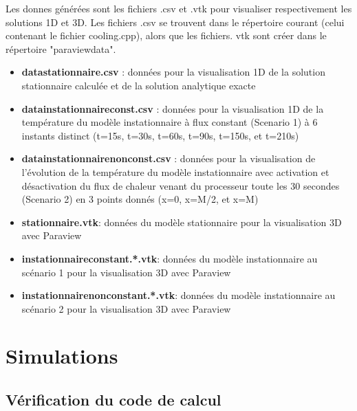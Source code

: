 \documentclass[11pt]{article} %
\begin{document}
Les donnes générées sont les fichiers .csv et .vtk pour visualiser respectivement les solutions 1D et 3D. Les fichiers .csv se trouvent dans le répertoire courant (celui contenant le fichier cooling.cpp), alors que les fichiers. vtk sont créer dans le répertoire "paraview\textunderscore data".
\begin{itemize}
	\item\textbf{data\textunderscore stationnaire.csv} : données pour la visualisation 1D de la solution stationnaire calculée et de la solution analytique exacte
	\item\textbf{data\textunderscore instationnaire\textunderscore const.csv} : données pour la visualisation 1D de la température du modèle instationnaire à flux constant (Scenario 1) à 6 instants distinct (t=15s, t=30s, t=60s, t=90s, t=150s, et t=210s)
	\item\textbf{data\textunderscore instationnaire\textunderscore non\textunderscore const.csv} : données pour la visualisation de l’évolution de la température du modèle instationnaire avec activation et désactivation du flux de chaleur venant du processeur toute les 30 secondes (Scenario 2) en 3 points donnés (x=0, x=M/2, et x=M)
	\item\textbf{stationnaire.vtk}: données du modèle stationnaire pour la visualisation 3D avec Paraview
	\item\textbf{instationnaire\textunderscore constant.*.vtk}: données du modèle instationnaire au scénario 1 pour la visualisation 3D avec Paraview
	\item\textbf{instationnaire\textunderscore non\textunderscore constant.*.vtk}: données du modèle instationnaire au scénario 2 pour la visualisation 3D avec Paraview
\end{itemize}

\section{Simulations }

	\subsection{Vérification du code de calcul}

	
\end{document}
